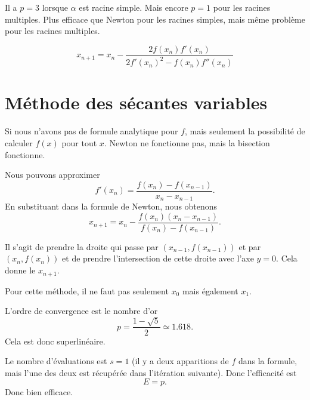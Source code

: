 Il a \( p=3\) lorsque \( \alpha\) est racine simple. Mais encore \( p=1\) pour les racines multiples. Plus efficace que Newton pour les racines simples, mais même problème pour les racines multiples.

\begin{equation}
	x_{n+1}=x_n-\frac{ 2f(x_n)f'(x_n) }{ 2f'(x_n)^2-f(x_n)f''(x_n) }
\end{equation}

\section{Méthode des sécantes variables}
\label{SECooIUEUooVcHAoc}

Si nous n'avons pas de formule analytique pour \( f\), mais seulement la possibilité de calculer \( f(x)\) pour tout \( x\). Newton ne fonctionne pas, mais la bisection fonctionne.

Nous pouvons approximer
\begin{equation}
	f'(x_n)=\frac{ f(x_n)-f(x_{n-1}) }{ x_n-x_{n-1} }.
\end{equation}
En substituant dans la formule de Newton, nous obtenons
\begin{equation}
	x_{n+1}=x_n-\frac{ f(x_n)(x_n-x_{n-1}) }{ f(x_n)-f(x_{n-1}) }.
\end{equation}

Il s'agit de prendre la droite qui passe par \( (x_{n-1},f(x_{n-1}))\) et par \( (x_n,f(x_n))\) et de prendre l'intersection de cette droite avec l'axe \( y=0\). Cela donne le \( x_{n+1}\).

Pour cette méthode, il ne faut pas seulement \( x_0\) mais également \( x_1\).

L'ordre de convergence est le nombre d'or
\begin{equation}    \label{EQooQEFCooUsGVjP}
	p=\frac{ 1-\sqrt{ 5 } }{ 2 }\simeq 1.618.
\end{equation}
Cela est donc superlinéaire.

Le nombre d'évaluations est \( s=1\) (il y a deux apparitions de \( f\) dans la formule, mais l'une des deux est récupérée dans l'itération suivante). Donc l'efficacité est
\begin{equation}
	E=p.
\end{equation}
Donc bien efficace.

